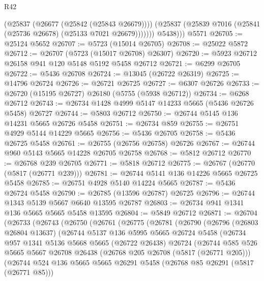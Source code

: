 \begin{lexlean}{R42}
\begin{coremodule}
              (@25837 (@26677 (@25842 (@25843 @26679))))
              (@25837 (@25839 @7016 (@25841 (@25736 @26678) (@25133 @7021 @26679)))))))
          @5438)))
    @5571
@26705 := @25124 @5652
@26707 := @5723 (@15014 @26705)
@26708 := @25022 @5872
@26712 := @26707 (@5723 (@15017 @26708) @26307)
@26720 := @5923 @26712 @26158 @941 @120 @5148 @5192 @5458 @26712
@26721 := @6299 @26705
@26722 := @5436 @26708
@26724 := @13045 (@26722 @26319)
@26725 := @14796 @26724
@26726 := @26721 @26725
@26727 := @6307 @26726
@26733 := @26720 (@15195 @26727) @26180 (@5755 (@5938 @26712))
@26734 := @6268 @26712
@26743 := @26734 @1428 @4999 @5147 @14233 @5665 (@5436 @26726 @5458) @26727
@26744 := @5803 @26712
@26750 := @26744 @5145 @136 @14231 @5665 @26726 @5458
@26751 := @26734 @859
@26755 := @26751 @4929 @5144 @14229 @5665
@26756 := @5436 @26705
@26758 := @5436 @26725 @5458
@26761 := @26755 (@26756 @26758) @26726
@26767 := @26744 @960 @5143 @5665 @14228 @26705 @26758
@26768 := @5812 @26712
@26770 := @26768 @239 @26705
@26771 := @5818 @26712
@26775 := @26767 (@26770 (@5817 (@26771 @239)))
@26781 := @26744 @5141 @136 @14226 @5665 @26725 @5458
@26785 := @26751 @4928 @5140 @14224 @5665
@26787 := @5436 @26724 @5458
@26790 := @26785 (@13596 @26787) @26725
@26796 := @26744 @1343 @5139 @5667 @6640 @13595 @26787
@26803 := @26734 @941 @1341 @136 @5665 @5665 @5458 @13595
@26804 := @5849 @26712
@26871 := @26704
    (@26733
      (@26743
        (@26750
          (@26761
            (@26775
              (@26781
                (@26790
                  (@26796
                    (@26803 @26804 @13637)
                    (@26744
                      @5137
                      @136
                      @5995
                      @5665
                      @26724
                      @5458
                      (@26734
                        @957
                        @1341
                        @5136
                        @5668
                        @5665
                        (@26722 @26438)
                        @26724
                        (@26744
                          @585
                          @526
                          @5665
                          @5667
                          @26708
                          @26438
                          (@26768 @205 @26708 (@5817 (@26771 @205)))
                          (@26744
                            @524
                            @136
                            @5665
                            @5665
                            @26291
                            @5458
                            (@26768 @85 @26291 (@5817 (@26771 @85)))

\end{coremodule}
\end{lexlean}
